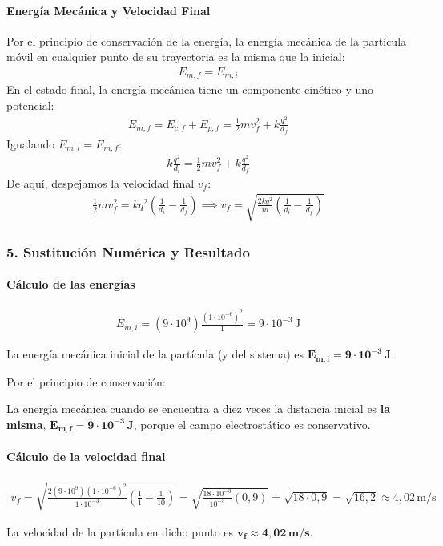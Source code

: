 \paragraph*{Energía Mecánica y Velocidad Final}
Por el principio de conservación de la energía, la energía mecánica de la partícula móvil en cualquier punto de su trayectoria es la misma que la inicial:
\begin{gather}
    E_{m,f} = E_{m,i}
\end{gather}
En el estado final, la energía mecánica tiene un componente cinético y uno potencial:
\begin{gather}
    E_{m,f} = E_{c,f} + E_{p,f} = \frac{1}{2}mv_f^2 + k \frac{q^2}{d_f}
\end{gather}
Igualando $E_{m,i} = E_{m,f}$:
\begin{gather}
    k \frac{q^2}{d_i} = \frac{1}{2}mv_f^2 + k \frac{q^2}{d_f}
\end{gather}
De aquí, despejamos la velocidad final $v_f$:
\begin{gather}
    \frac{1}{2}mv_f^2 = k q^2 \left(\frac{1}{d_i} - \frac{1}{d_f}\right) \implies v_f = \sqrt{\frac{2kq^2}{m}\left(\frac{1}{d_i} - \frac{1}{d_f}\right)}
\end{gather}

\subsubsection*{5. Sustitución Numérica y Resultado}
\paragraph*{Cálculo de las energías}
\begin{gather}
    E_{m,i} = (9\cdot10^{9}) \frac{(1\cdot10^{-6})^2}{1} = 9 \cdot 10^{-3} \, \text{J}
\end{gather}
\begin{cajaresultado}
    La energía mecánica inicial de la partícula (y del sistema) es $\boldsymbol{E_{m,i} = 9 \cdot 10^{-3} \, \textbf{J}}$.
\end{cajaresultado}
\medskip
Por el principio de conservación:
\begin{cajaresultado}
    La energía mecánica cuando se encuentra a diez veces la distancia inicial es \textbf{la misma}, $\boldsymbol{E_{m,f} = 9 \cdot 10^{-3} \, \textbf{J}}$, porque el campo electrostático es conservativo.
\end{cajaresultado}
\paragraph*{Cálculo de la velocidad final}
\begin{gather}
    v_f = \sqrt{\frac{2(9\cdot10^{9})(1\cdot10^{-6})^2}{1\cdot10^{-3}}\left(\frac{1}{1} - \frac{1}{10}\right)} = \sqrt{\frac{18 \cdot 10^{-3}}{10^{-3}}(0,9)} = \sqrt{18 \cdot 0,9} = \sqrt{16,2} \approx 4,02 \, \text{m/s}
\end{gather}
\begin{cajaresultado}
    La velocidad de la partícula en dicho punto es $\boldsymbol{v_f \approx 4,02 \, \textbf{m/s}}$.
\end{cajaresultado}

